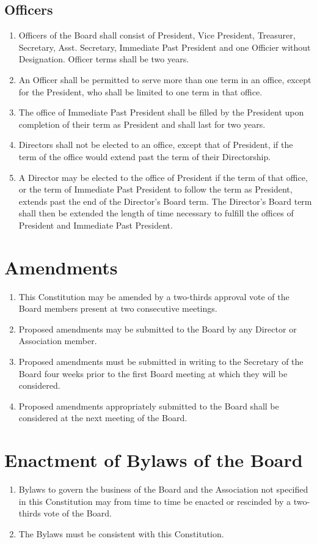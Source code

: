 \documentclass[a4paper,11pt]{book}
\begin{document}
\section{Officers}
\begin{enumerate}
\item Officers of the Board shall consist of President, Vice President, Treasurer, Secretary, Asst. Secretary, Immediate Past President and one Officier without Designation. Officer terms shall be two years.
\item An Officer shall be permitted to serve more than one term in an office, except for the President, who shall be limited to one term in that office.
\item The office of Immediate Past President shall be filled by the President upon completion of their term as President and shall last for two years.
\item Directors shall not be elected to an office, except that of President, if the term of the office would extend past the term of their Directorship.
\item A Director may be elected to the office of President if the term of that office, or the term of Immediate Past President to follow the term as President, extends past the end of the Director's Board term. The Director's Board term shall then be extended the length of time necessary to fulfill the offices of President and Immediate Past President.
\end{enumerate}
\chapter{ Amendments }
\begin{enumerate}
\item This Constitution may be amended by a two-thirds approval vote of the Board members present at two consecutive meetings.
\item Proposed amendments may be submitted to the Board by any Director or Association member.
\item Proposed amendments must be submitted in writing to the Secretary of the Board four weeks prior to the first Board meeting at which they will be considered.
\item Proposed amendments appropriately submitted to the Board shall be considered at the next meeting of the Board.
\end{enumerate}
\chapter{Enactment of Bylaws of the Board}
\begin{enumerate}
\item Bylaws to govern the business of the Board and the Association not specified in this Constitution may from time to time be enacted or rescinded by a two-thirds vote of the Board.
\item The Bylaws must be consistent with this Constitution.
\end{enumerate}
\end{document}
